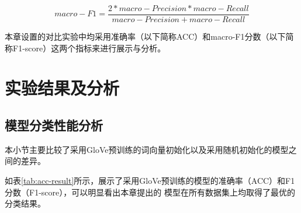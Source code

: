 \begin{equation}\label{mf1}
    macro-F1=\frac{2*macro-Precision * macro-Recall}{macro-Precision + macro-Recall}
\end{equation}

本章设置的对比实验中均采用准确率（以下简称ACC）和macro-F1分数（以下简称F1-score）这两个指标来进行展示与分析。
\section{实验结果及分析}
\subsection{模型分类性能分析}
本小节主要比较了采用GloVe预训练的词向量初始化以及采用随机初始化的模型之间的差异。

如表\ref{tab:acc-result}所示，展示了采用GloVe预训练的模型的准确率（ACC）和F1分数（F1-score），可以明显看出本章提出的
模型在所有数据集上均取得了最优的分类结果。

